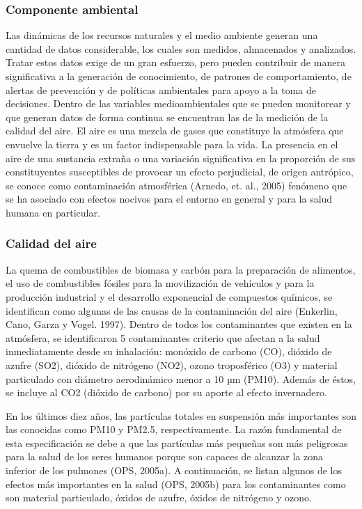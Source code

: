 \subsubsection{Componente ambiental}

Las dinámicas de los recursos naturales y el medio ambiente generan una cantidad de datos considerable, los cuales son medidos, almacenados y analizados. Tratar estos datos exige de un gran esfuerzo, pero pueden contribuir de manera significativa a la generación de conocimiento, de patrones de comportamiento, de alertas de prevención y de políticas ambientales para apoyo a la toma de decisiones.
Dentro de las variables medioambientales que se pueden monitorear y que generan datos de forma continua se encuentran las de la medición de la calidad del aire.
El aire es una mezcla de gases que constituye la atmósfera que envuelve la tierra y es un factor indispensable para la vida. La presencia en el aire de una sustancia extraña o una variación significativa en la proporción de sus constituyentes susceptibles de provocar un efecto perjudicial, de origen antrópico, se conoce como contaminación atmosférica (Arnedo, et. al., 2005) fenómeno que se ha asociado con efectos nocivos para el entorno en general y para la salud humana en particular.

\subsubsection{Calidad del aire}

La quema de combustibles de biomasa y carbón para la preparación de alimentos, el uso de combustibles fósiles para la movilización de vehículos y para la producción industrial y el desarrollo exponencial de compuestos químicos, se identifican como algunas de las causas de la contaminación del aire (Enkerlin, Cano, Garza y Vogel. 1997).
Dentro de todos los contaminantes que existen en la atmósfera, se identificaron 5 contaminantes criterio que afectan a la salud inmediatamente desde su inhalación: monóxido de carbono (CO), dióxido de azufre (SO2), dióxido de nitrógeno (NO2), ozono troposférico (O3) y material particulado con diámetro aerodinámico menor a 10 µm (PM10). Además de éstos, se incluye al CO2 (dióxido de carbono) por su aporte al efecto invernadero.

En los últimos diez años, las partículas totales en suspensión más importantes son las conocidas como PM10 y PM2.5, respectivamente. La razón fundamental de esta especificación se debe a que las partículas más pequeñas son más peligrosas para la salud de los seres humanos porque son capaces de alcanzar la zona inferior de los pulmones (OPS, 2005a). A continuación, se listan algunos de los efectos más importantes en la salud (OPS, 2005b) para los contaminantes  como son material particulado, óxidos de azufre, óxidos de nitrógeno y ozono.

